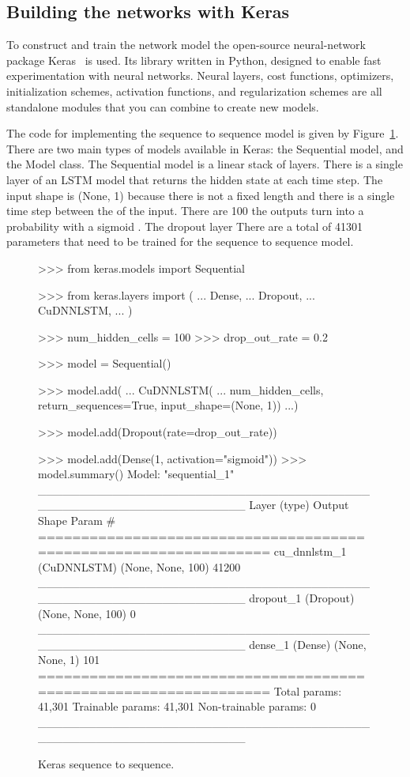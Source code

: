 \subsection{Building the networks with Keras}

To construct and train the network model the open-source neural-network package
Keras~\cite{Chollet2015} is used. Its library written in Python, designed to
enable fast experimentation with neural networks.
Neural layers, cost functions, optimizers, initialization schemes, activation
functions, and regularization schemes are all standalone modules that you can
combine to create new models.

The code for implementing the sequence to sequence model is given by
Figure~\ref{fig:keras_sequence_to_sequence}. There are two main types of models
available in Keras: the Sequential model, and the Model class. The Sequential
model is a linear stack of layers. There is a single layer of an LSTM model that
returns the hidden state at each time step. The input shape is (None, 1) because
there is not a fixed length and there is a single time step between the of the
input. There are 100 the outputs turn into a probability with a sigmoid . The
dropout layer 
There are a total of 41301 parameters that need to be trained for the sequence
to sequence model.

\begin{figure}[!htbp]
\begin{usagepy}
>>> from keras.models import Sequential

>>> from keras.layers import (
...     Dense,
...     Dropout,
...     CuDNNLSTM,
... )

>>> num_hidden_cells = 100
>>> drop_out_rate = 0.2

>>> model = Sequential()

>>> model.add(
...    CuDNNLSTM(
...        num_hidden_cells, return_sequences=True, input_shape=(None, 1))
...)

>>> model.add(Dropout(rate=drop_out_rate))

>>> model.add(Dense(1, activation="sigmoid"))
>>> model.summary()
Model: "sequential_1"
_________________________________________________________________
Layer (type)                 Output Shape              Param #   
=================================================================
cu_dnnlstm_1 (CuDNNLSTM)     (None, None, 100)         41200     
_________________________________________________________________
dropout_1 (Dropout)          (None, None, 100)         0         
_________________________________________________________________
dense_1 (Dense)              (None, None, 1)           101       
=================================================================
Total params: 41,301
Trainable params: 41,301
Non-trainable params: 0
_________________________________________________________________

\end{usagepy}
\caption{Keras sequence to sequence.}\label{fig:keras_sequence_to_sequence}
\end{figure}

